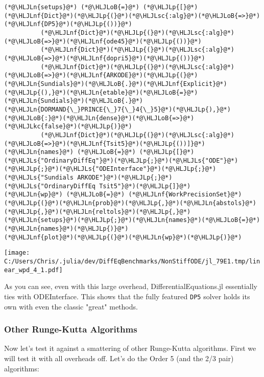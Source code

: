 \documentclass[12pt,a4paper]{article}
\newcommand{\HLJLkc}[1]{\textcolor[RGB]{59,151,46}{\textit{#1}}}
\newcommand{\HLJLn}[1]{#1}
\newcommand{\HLJLnf}[1]{\textcolor[RGB]{66,102,213}{#1}}
\newcommand{\HLJLs}[1]{\textcolor[RGB]{201,61,57}{#1}}
\newcommand{\HLJLsc}[1]{\textcolor[RGB]{201,61,57}{#1}}
\newcommand{\HLJLoB}[1]{\textcolor[RGB]{102,102,102}{\textbf{#1}}}
\newcommand{\HLJLp}[1]{#1}
\begin{document}
\begin{lstlisting}
(*@\HLJLn{setups}@*) (*@\HLJLoB{=}@*) (*@\HLJLp{[}@*)(*@\HLJLnf{Dict}@*)(*@\HLJLp{(}@*)(*@\HLJLsc{:alg}@*)(*@\HLJLoB{=>}@*)(*@\HLJLnf{DP5}@*)(*@\HLJLp{())}@*)
          (*@\HLJLnf{Dict}@*)(*@\HLJLp{(}@*)(*@\HLJLsc{:alg}@*)(*@\HLJLoB{=>}@*)(*@\HLJLnf{ode45}@*)(*@\HLJLp{())}@*)
          (*@\HLJLnf{Dict}@*)(*@\HLJLp{(}@*)(*@\HLJLsc{:alg}@*)(*@\HLJLoB{=>}@*)(*@\HLJLnf{dopri5}@*)(*@\HLJLp{())}@*)
          (*@\HLJLnf{Dict}@*)(*@\HLJLp{(}@*)(*@\HLJLsc{:alg}@*)(*@\HLJLoB{=>}@*)(*@\HLJLnf{ARKODE}@*)(*@\HLJLp{(}@*)(*@\HLJLn{Sundials}@*)(*@\HLJLoB{.}@*)(*@\HLJLnf{Explicit}@*)(*@\HLJLp{(),}@*)(*@\HLJLn{etable}@*)(*@\HLJLoB{=}@*)(*@\HLJLn{Sundials}@*)(*@\HLJLoB{.}@*)(*@\HLJLn{DORMAND{\_}PRINCE{\_}7{\_}4{\_}5}@*)(*@\HLJLp{),}@*)(*@\HLJLoB{:}@*)(*@\HLJLn{dense}@*)(*@\HLJLoB{=>}@*)(*@\HLJLkc{false}@*)(*@\HLJLp{)}@*)
          (*@\HLJLnf{Dict}@*)(*@\HLJLp{(}@*)(*@\HLJLsc{:alg}@*)(*@\HLJLoB{=>}@*)(*@\HLJLnf{Tsit5}@*)(*@\HLJLp{())]}@*)
(*@\HLJLn{names}@*) (*@\HLJLoB{=}@*) (*@\HLJLp{[}@*)(*@\HLJLs{"OrdinaryDiffEq"}@*)(*@\HLJLp{;}@*)(*@\HLJLs{"ODE"}@*)(*@\HLJLp{;}@*)(*@\HLJLs{"ODEInterface"}@*)(*@\HLJLp{;}@*)(*@\HLJLs{"Sundials ARKODE"}@*)(*@\HLJLp{;}@*)(*@\HLJLs{"OrdinaryDiffEq Tsit5"}@*)(*@\HLJLp{]}@*)
(*@\HLJLn{wp}@*) (*@\HLJLoB{=}@*) (*@\HLJLnf{WorkPrecisionSet}@*)(*@\HLJLp{(}@*)(*@\HLJLn{prob}@*)(*@\HLJLp{,}@*)(*@\HLJLn{abstols}@*)(*@\HLJLp{,}@*)(*@\HLJLn{reltols}@*)(*@\HLJLp{,}@*)(*@\HLJLn{setups}@*)(*@\HLJLp{;}@*)(*@\HLJLn{names}@*)(*@\HLJLoB{=}@*)(*@\HLJLn{names}@*)(*@\HLJLp{)}@*)
(*@\HLJLnf{plot}@*)(*@\HLJLp{(}@*)(*@\HLJLn{wp}@*)(*@\HLJLp{)}@*)
\end{lstlisting}

\texttt{[image: C:/Users/Chris/.julia/dev/DiffEqBenchmarks/NonStiffODE/jl\_79E1.tmp/linear\_wpd\_4\_1.pdf]}

As you can see, even with this large overhead, DifferentialEquations.jl essentially ties with ODEInterface. This shows that the fully featured \texttt{DP5} solver holds its own with even the classic "great" methods.

\subsubsection{Other Runge-Kutta Algorithms}
Now let's test it against a smattering of other Runge-Kutta algorithms. First we will test it with all overheads off. Let's do the Order 5 (and the 2/3 pair) algorithms:
\end{document}
